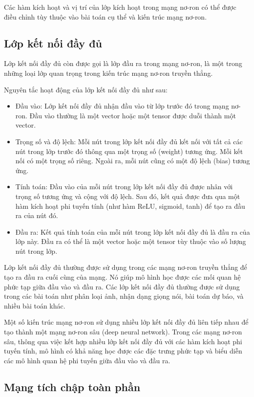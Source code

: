 Các hàm kích hoạt và vị trí của lớp kích hoạt trong mạng nơ-ron có thể được điều chỉnh tùy thuộc vào bài toán cụ thể và kiến trúc mạng nơ-ron.

\subsection{Lớp kết nối đầy đủ}
Lớp kết nối đầy đủ còn được gọi là lớp đầu ra trong mạng nơ-ron, là một trong những loại lớp quan trọng trong kiến trúc mạng nơ-ron truyền thẳng.

Nguyên tắc hoạt động của lớp kết nối đầy đủ như sau:

\begin{itemize}
    \item Đầu vào: Lớp kết nối đầy đủ nhận đầu vào từ lớp trước đó trong mạng nơ-ron. Đầu vào thường là một vector hoặc một tensor được duỗi thành một vector.
    \item Trọng số và độ lệch: Mỗi nút trong lớp kết nối đầy đủ kết nối với tất cả các nút trong lớp trước đó thông qua một trọng số (weight) tương ứng. Mỗi kết nối có một trọng số riêng. Ngoài ra, mỗi nút cũng có một độ lệch (bias) tương ứng.
    \item Tính toán: Đầu vào của mỗi nút trong lớp kết nối đầy đủ được nhân với trọng số tương ứng và cộng với độ lệch. Sau đó, kết quả được đưa qua một hàm kích hoạt phi tuyến tính (như hàm ReLU, sigmoid, tanh) để tạo ra đầu ra của nút đó.
    \item Đầu ra: Kết quả tính toán của mỗi nút trong lớp kết nối đầy đủ là đầu ra của lớp này. Đầu ra có thể là một vector hoặc một tensor tùy thuộc vào số lượng nút trong lớp.
\end{itemize}

Lớp kết nối đầy đủ thường được sử dụng trong các mạng nơ-ron truyền thẳng để tạo ra đầu ra cuối cùng của mạng. Nó giúp mô hình học được các mối quan hệ phức tạp giữa đầu vào và đầu ra. Các lớp kết nối đầy đủ thường được sử dụng trong các bài toán như phân loại ảnh, nhận dạng giọng nói, bài toán dự báo, và nhiều bài toán khác.

Một số kiến trúc mạng nơ-ron sử dụng nhiều lớp kết nối đầy đủ liên tiếp nhau để tạo thành một mạng nơ-ron sâu (deep neural network). Trong các mạng nơ-ron sâu, thông qua việc kết hợp nhiều lớp kết nối đầy đủ với các hàm kích hoạt phi tuyến tính, mô hình có khả năng học được các đặc trưng phức tạp và biểu diễn các mô hình quan hệ phi tuyến giữa đầu vào và đầu ra.


\subsection{Mạng tích chập toàn phần}

